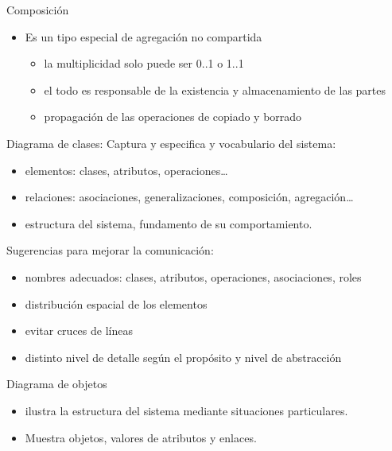 \documentclass[12pt, twoside, openright]{report} %
\begin{document}
Composición
\begin{figure}[H]
	{\def\svgwidth{.7\textwidth}
		}
\end{figure}
\begin{itemize}
	\item Es un tipo especial de agregación no compartida

	      \begin{itemize}
		      \item la multiplicidad solo puede ser 0..1 o 1..1
		      \item el todo es responsable de la existencia y almacenamiento de las
		            partes
		      \item propagación de las operaciones de copiado y borrado
	      \end{itemize}
\end{itemize}

Diagrama de clases: Captura y especifica y vocabulario del sistema:

\begin{itemize}
	\item elementos: clases, atributos, operaciones\ldots{}
	\item relaciones: asociaciones, generalizaciones, composición,
	      agregación\ldots{}
	\item estructura del sistema, fundamento de su comportamiento.
\end{itemize}
\pagebreak

Sugerencias para mejorar la comunicación:

\begin{itemize}
	\item nombres adecuados: clases, atributos, operaciones, asociaciones,
	      roles
	\item distribución espacial de los elementos
	\item evitar cruces de líneas
	\item distinto nivel de detalle según el propósito y nivel de
	      abstracción
\end{itemize}

Diagrama de objetos

\begin{itemize}
	\item ilustra la estructura del sistema mediante situaciones
	      particulares.
	\item Muestra objetos, valores de atributos y enlaces.
\end{itemize}
\end{document}
